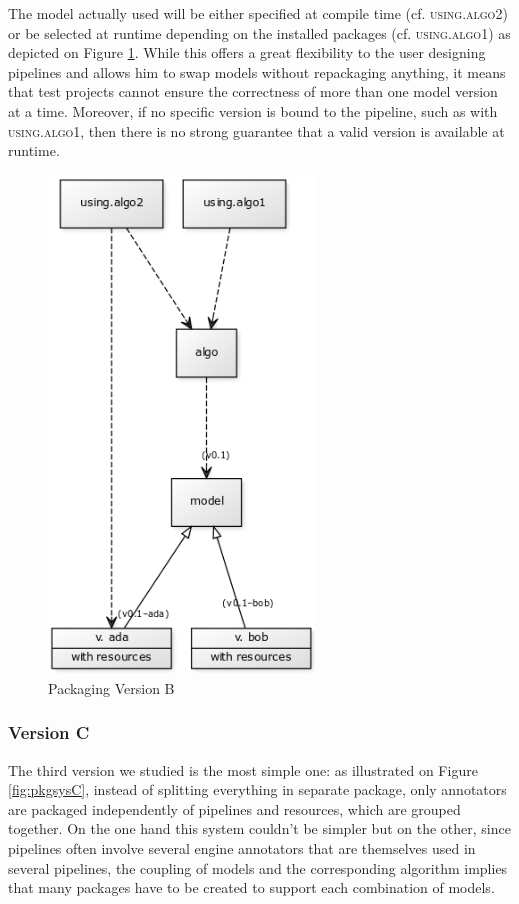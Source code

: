 \documentclass{article}
\newcommand{\id}[1]{\mbox{\textsc{#1}}}
\begin{document}
The model actually used will be either specified at compile time (cf. \id{using.algo2}) or be selected at runtime depending on the installed packages (cf. \id{using.algo1}) as depicted on Figure \ref{fig:pkgsysB}. While this offers a great flexibility to the user designing pipelines and allows him to swap models without repackaging anything, it means that test projects cannot ensure the correctness of more than one model version at a time. Moreover, if no specific version is bound to the pipeline, such as with \id{using.algo1}, then there is no strong guarantee that a valid version is available at runtime.

\begin{figure}
\centering
\includegraphics[width=200pt]{res/packaging_version_B.png}
\caption{Packaging Version B}
\label{fig:pkgsysB}
\end{figure}


\subsubsection{Version C}

The third version we studied is the most simple one: as illustrated on Figure \ref{fig:pkgsysC}, instead of splitting everything in separate package, only annotators are packaged independently of pipelines and resources, which are grouped together. On the one hand this system couldn't be simpler but on the other, since pipelines often involve several engine annotators that are themselves used in several pipelines, the coupling of models and the corresponding algorithm implies that many packages have to be created to support each combination of models.
\end{document}
